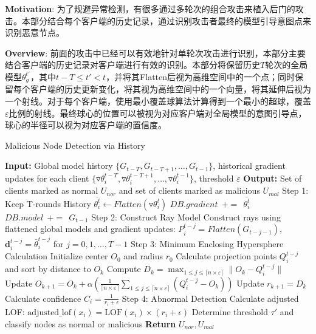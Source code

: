 \documentclass[lettersize,journal]{IEEEtran}
\begin{document}
\textbf{Motivation}: 为了规避异常检测，有很多通过多轮次的组合攻击来植入后门的攻击。本部分结合每个客户端的历史记录，通过识别攻击者最终的模型引导意图点来识别恶意节点。

\textbf{Overview}: 前面的攻击中已经可以有效地针对单轮次攻击进行识别，本部分主要结合客户端的历史记录对客户端进行有效的识别。本部分将保留历史$T$轮次的全局模型$\theta_g^{t'}$，其中$t-T\leq t'< t$，并将其Flatten后视为高维空间中的一个点；同时保留每个客户端的历史更新变化，将其视为高维空间中的一个向量，将其延伸后视为一个射线。对于每个客户端，使用最小覆盖球算法计算得到一个最小的超球，覆盖$\varepsilon$比例的射线。最终球心的位置可以被视为对应客户端对全局模型的意图引导点，球心的半径可以视为对应客户端的置信度。

\begin{algorithm}
\caption{Malicious Node Detection via History}
\label{alg:malicious-node-detection-history}
\begin{algorithmic}[1]
\State \textbf{Input:} Global model history $\{G_{t-T}, G_{t-T+1}, \dots, G_{t-1}\}$, historical gradient updates for each client $\{\triangledown \theta_{i}^{t-T}, \triangledown \theta_{i}^{t-T+1}, \dots, \triangledown \theta_{i}^{t-1}\}$, threshold $\varepsilon$
\State \textbf{Output:} Set of clients marked as normal $U_{nor}$ and set of clients marked as malicious $U_{mal}$
\State Step 1: Keep T-rounds History
    \State $\bar{\theta_i^t} \gets Flatten(\triangledown \theta_{i}^t)$
    \State $DB.gradient\ \ +=\ \ \bar{\theta_i^t}$
    \State $DB.model\ \ +=\ \ G_{t-1}$
\EndFor
\State Step 2: Construct Ray Model
    \State Construct rays using flattened global models and gradient updates:
    \State $P_{i}^{t-j} = Flatten(G_{t-j-1})$, $\mathbf{d}_{i}^{t-j} = \bar{\theta}_{i}^{t-j}$ for $j = 0, 1, \ldots, T-1$
\EndFor
\State Step 3: Minimum Enclosing Hypersphere Calculation
    \State Initialize center $O_0$ and radius $r_0$
        \State Calculate projection points $Q_{i}^{t-j}$ and sort by distance to $O_k$
        \State Compute $D_k = \max_{1\leq j\leq \lceil n\times \varepsilon\rceil} \|O_k - Q_{i}^{t-j}\|$
        \State Update $O_{k+1} = O_k + \alpha \left(\frac{1}{\lceil n\times \varepsilon\rceil} \sum_{1\leq j\leq \lceil n\times \varepsilon\rceil} (Q_{i}^{t-j} - O_k)\right)$
        \State Update $r_{k+1} = D_k$
    \EndWhile
    \State Calculate confidence $C_i = \frac{1}{r_i + \epsilon}$
\EndFor
\State Step 4: Abnormal Detection
    \State Calculate adjusted LOF: $\text{adjusted\_lof}(x_i) = \text{LOF}(x_i) \times (r_i + \epsilon)$
    \State Determine threshold $\tau'$ and classify nodes as normal or malicious
\EndFor
\State \textbf{Return} $U_{nor}, U_{mal}$
\end{algorithmic}
\end{algorithm}
\end{document}
